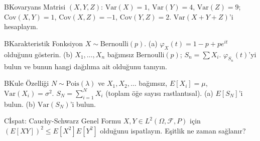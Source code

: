 \begin{alistirma}[Al.4.8]{B}{Kovaryans Matrisi}
$(X, Y, Z)$: $\mathrm{Var}(X) = 1$, $\mathrm{Var}(Y) = 4$, $\mathrm{Var}(Z) = 9$;
$\mathrm{Cov}(X,Y) = 1$, $\mathrm{Cov}(X,Z) = -1$, $\mathrm{Cov}(Y,Z) = 2$.
$\mathrm{Var}(X + Y + Z)$'i hesaplayın.
\end{alistirma}

\begin{alistirma}[Al.4.9]{B}{Karakteristik Fonksiyon}
$X \sim \mathrm{Bernoulli}(p)$.
(a) $\varphi_X(t) = 1 - p + pe^{it}$ olduğunu gösterin.
(b) $X_1, \ldots, X_n$ bağımsız $\mathrm{Bernoulli}(p)$; $S_n = \sum X_i$.
$\varphi_{S_n}(t)$'yi bulun ve bunun hangi dağılıma ait olduğunu tanıyın.
\end{alistirma}

\begin{alistirma}[Al.4.10]{B}{Kule Özelliği}
$N \sim \mathrm{Pois}(\lambda)$ ve $X_1, X_2, \ldots$ bağımsız, $E[X_i] = \mu$, $\mathrm{Var}(X_i) = \sigma^2$.
$S_N = \sum_{i=1}^N X_i$ (toplam öğe sayısı rastlantısal).
(a) $E[S_N]$'i bulun. (b) $\mathrm{Var}(S_N)$'i bulun.
\end{alistirma}

\begin{alistirma}[Al.4.11]{C}{İspat: Cauchy-Schwarz Genel Formu}
$X, Y \in L^2(\Omega, \mathcal{F}, P)$ için $(E[XY])^2 \leq E[X^2] E[Y^2]$ olduğunu ispatlayın.
Eşitlik ne zaman sağlanır?
\end{alistirma}

